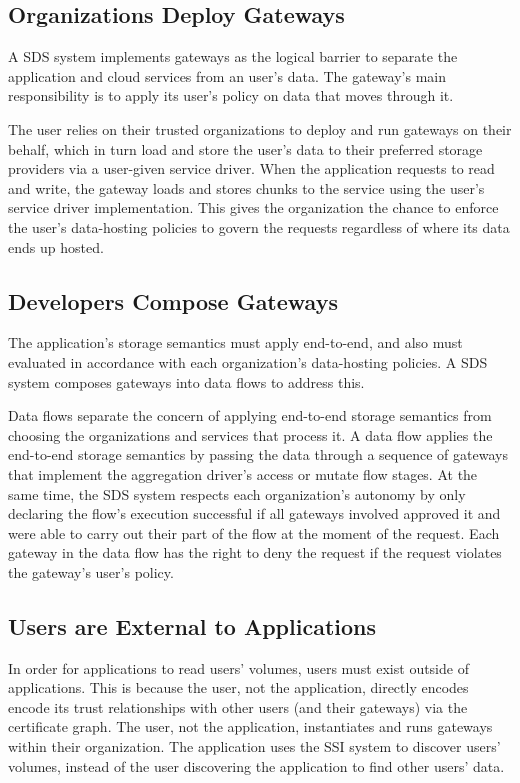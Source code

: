 \subsection{Organizations Deploy Gateways}

A SDS system implements gateways as
the logical barrier to separate the application and
cloud services from an user's data.  The gateway's main
responsibility is to apply its user's policy on data
that moves through it.

The user relies on their trusted organizations to deploy and run gateways on
their behalf, which in turn load and store the user's data to their preferred
storage providers via a user-given service driver.
When the application requests to read and write, the
gateway loads and stores chunks to the service using the user's
service driver implementation.  This gives the organization the chance to
enforce the user's data-hosting policies to govern the requests regardless of where its data
ends up hosted.

\subsection{Developers Compose Gateways}

The application's storage semantics must apply end-to-end, and also must 
evaluated in accordance with each organization's data-hosting policies.
A SDS system composes gateways into data flows to address this.

Data flows separate the concern of applying end-to-end storage semantics from 
choosing the organizations and services that process it.  A data flow applies
the end-to-end storage semantics by passing the data through a sequence of
gateways that implement the aggregation driver's access or mutate flow stages.
At the same time, the SDS system respects each organization's autonomy by
only declaring the flow's execution successful if all gateways involved approved it
and were able to carry out their part of the flow at the moment of the request.
Each gateway in the data flow has the right to deny the request if the request
violates the gateway's user's policy.

\subsection{Users are External to Applications}

In order for applications to read users' volumes, users must exist outside of
applications.  This is because the user, not the application, directly encodes
encode its trust relationships with other users (and their gateways) via the
certificate graph.  The user, not the application, instantiates and runs
gateways within their organization.  The application uses the SSI system to
discover users' volumes, instead of the user discovering the application to find
other users' data.

